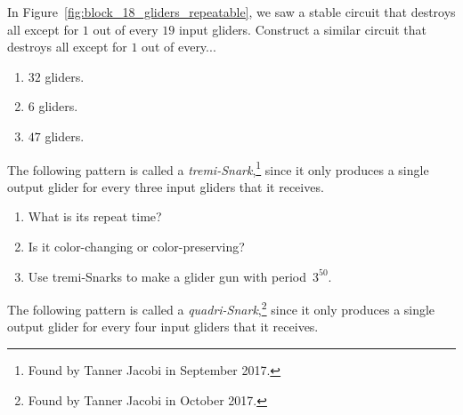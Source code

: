 \begin{multicols}{2}
	
	\mfilbreak
	
	
	\begin{problem}\label{exer:stable_thin_out_gliders} 
		In Figure~\ref{fig:block_18_gliders_repeatable}, we saw a stable circuit that destroys all except for $1$ out of every $19$ input gliders. Construct a similar circuit that destroys all except for $1$ out of every...\smallskip
		
		\begin{enumerate}[label=\bf\color{ocre}(\alph*)]
			\item $32$ gliders.
			
			\item $6$ gliders.
			
			\item $47$ gliders.
		\end{enumerate}
	\end{problem}
	
	
	\mfilbreak
	
	
	\begin{problem}\label{exer:tremi_snark}
		The following pattern is called a \emph{tremi-Snark},\footnote{Found by Tanner Jacobi in September 2017.} since it only produces a single output glider for every three input gliders that it receives.
		
		\begin{center}
		\end{center}
		
		\begin{enumerate}[label=\bf\color{ocre}(\alph*)]
			\item {} What is its repeat time?%
			
			\item {} Is it color-changing or color-preserving?%
			
			\item {} Use tremi-Snarks to make a glider gun with period~$3^{50}$.
		\end{enumerate}
	\end{problem}
	
	
	\mfilbreak
	
	
	\begin{problem}\label{exer:quadri_snark}
		The following pattern is called a \emph{quadri-Snark},\footnote{Found by Tanner Jacobi in October 2017.} since it only produces a single output glider for every four input gliders that it receives.
		

\end{problem}
\end{multicols}
